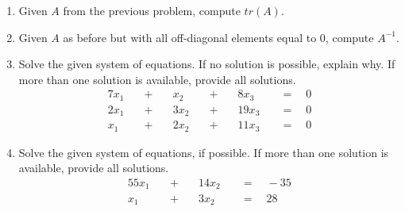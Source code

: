 \documentclass{article}
\begin{document}
\begin{enumerate}[\thesection .1]
\item Given $A$ from the previous problem, compute $tr(A)$.

\item Given $A$ as before but with all off-diagonal elements equal to $0$, compute $A^{-1}$.

\item Solve the given system of equations. If no solution is possible, explain why. If more than one solution is available, provide all solutions.
    \begin{alignat}{7}
        x_1 \quad &+ \quad &x_2 \quad &+ \quad &8 x_3 \quad &= \quad 0 \\
        2 x_1 \quad &+ \quad &3 x_2 \quad &+ \quad &19 x_3 \quad &= \quad 0 \\
        x_1 \quad &+ \quad &2 x_2 \quad &+ \quad &11 x_3 \quad &= \quad 0
    \end{alignat}

  \item Solve the given system of equations, if possible. If more than one solution is available, provide all solutions.
    \begin{alignat}{5}
      5 x_1 \quad &+ \quad &14 x_2 \quad &= \quad -35 \\
      x_1 \quad &+ \quad &3 x_2 \quad &= \quad 28
    \end{alignat}
\end{enumerate}
\end{document}
